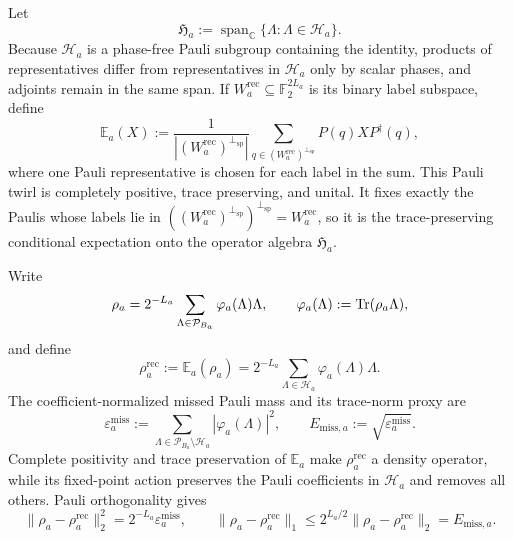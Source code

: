 \documentclass[
  aps,
  prx,
  reprint,
  superscriptaddress,
  amsmath,
  amssymb,
  nofootinbib,
  longbibliography
]{revtex4-2}
\newcommand{\Span}{\operatorname{span}}
\newcommand{\Pc}{\mathcal{P}}
\newcommand{\Fc}{\mathbb{F}_2}
\begin{document}
Let
\begin{equation}
\mathfrak H_a
:=
\Span_{\mathbb C}\{\Lambda:\Lambda\in\mathcal H_a\}.
\end{equation}
Because $\mathcal H_a$ is a phase-free Pauli subgroup containing the
identity, products of representatives differ from representatives in
$\mathcal H_a$ only by scalar phases, and adjoints remain in the same
span.   If
$W_a^{\mathrm{rec}}\subseteq\Fc^{2L_a}$ is its binary label subspace,
define
\begin{equation}
\mathbb E_a(X)
:=
\frac{1}{|(W_a^{\mathrm{rec}})^{\perp_{\mathrm{sp}}}|}
\sum_{q\in(W_a^{\mathrm{rec}})^{\perp_{\mathrm{sp}}}}
P(q)XP^\dagger(q),
\label{eq:supp-hidden-pauli-conditional-expectation}
\end{equation}
where one Pauli representative is chosen for each label in the sum.
This Pauli twirl is completely positive, trace preserving, and unital.
It fixes exactly the Paulis whose labels lie in
$((W_a^{\mathrm{rec}})^{\perp_{\mathrm{sp}}})^{\perp_{\mathrm{sp}}}
=W_a^{\mathrm{rec}}$, so it is the trace-preserving conditional
expectation onto the operator algebra $\mathfrak H_a$.

Write
\begin{equation}
\rho_a
=
2^{-L_a}
\sum_{\Lambda\in\Pc_{B_a}}
\varphi_a(\Lambda)\Lambda,
\qquad
\varphi_a(\Lambda):=\Tr(\rho_a\Lambda),
\label{eq:supp-hidden-block-pauli-expansion-normalization}
\end{equation}
and define
\begin{equation}
\rho_a^{\mathrm{rec}}
:=
\mathbb E_a(\rho_a)
=
2^{-L_a}
\sum_{\Lambda\in\mathcal H_a}
\varphi_a(\Lambda)\Lambda.
\label{eq:supp-truncated-hidden-block-state}
\end{equation}
The coefficient-normalized missed Pauli mass and its trace-norm proxy are
\begin{equation}
\varepsilon_a^{\mathrm{miss}}
:=
\sum_{\Lambda\in\Pc_{B_a}\setminus\mathcal H_a}
|\varphi_a(\Lambda)|^2,
\qquad
E_{\mathrm{miss},a}:=\sqrt{\varepsilon_a^{\mathrm{miss}}}.
\label{eq:supp-blockwise-missed-pauli-mass}
\end{equation}
Complete positivity and trace preservation of $\mathbb E_a$ make
$\rho_a^{\mathrm{rec}}$ a density operator, while its fixed-point action
preserves the Pauli coefficients in $\mathcal H_a$ and removes all others.
Pauli orthogonality gives
\begin{equation}
\|\rho_a-\rho_a^{\mathrm{rec}}\|_2^2
=
2^{-L_a}\varepsilon_a^{\mathrm{miss}},
\qquad
\|\rho_a-\rho_a^{\mathrm{rec}}\|_1
\le2^{L_a/2}\|\rho_a-\rho_a^{\mathrm{rec}}\|_2
=E_{\mathrm{miss},a}.
\label{eq:supp-blockwise-truncation-trace-distance}
\end{equation}
\end{document}
